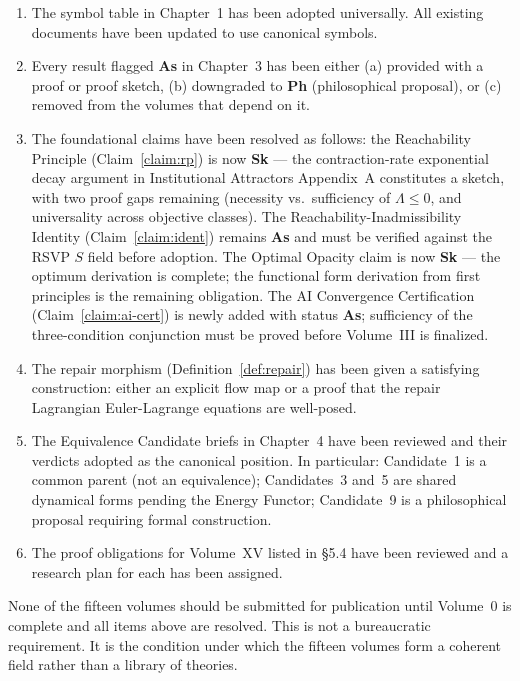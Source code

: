 \documentclass[11pt, a4paper]{book}
\theoremstyle{flyxion}
\theoremstyle{remark}
\begin{document}
\begin{enumerate}
\item The symbol table in Chapter~1 has been adopted universally.
  All existing documents have been updated to use canonical symbols.

\item Every result flagged \textbf{As} in Chapter~3 has been
  either (a) provided with a proof or proof sketch, (b) downgraded
  to \textbf{Ph} (philosophical proposal), or (c) removed from
  the volumes that depend on it.

\item The foundational claims have been resolved as follows:
  the Reachability Principle (Claim~\ref{claim:rp}) is now
  \textbf{Sk} --- the contraction-rate exponential decay argument
  in Institutional Attractors Appendix~A constitutes a sketch,
  with two proof gaps remaining (necessity vs.\ sufficiency of
  $\Lambda \leq 0$, and universality across objective classes).
  The Reachability-Inadmissibility Identity (Claim~\ref{claim:ident})
  remains \textbf{As} and must be verified against the RSVP $S$ field
  before adoption. The Optimal Opacity claim is now \textbf{Sk} ---
  the optimum derivation is complete; the functional form derivation
  from first principles is the remaining obligation. The AI
  Convergence Certification (Claim~\ref{claim:ai-cert}) is newly
  added with status \textbf{As}; sufficiency of the three-condition
  conjunction must be proved before Volume~III is finalized.

\item The repair morphism (Definition~\ref{def:repair}) has been
  given a satisfying construction: either an explicit flow map or
  a proof that the repair Lagrangian Euler-Lagrange equations are
  well-posed.

\item The Equivalence Candidate briefs in Chapter~4 have been
  reviewed and their verdicts adopted as the canonical position.
  In particular: Candidate~1 is a common parent (not an
  equivalence); Candidates~3 and~5 are shared dynamical forms
  pending the Energy Functor; Candidate~9 is a philosophical
  proposal requiring formal construction.

\item The proof obligations for Volume~XV listed in §5.4 have
  been reviewed and a research plan for each has been assigned.
\end{enumerate}

\begin{warningbox}
None of the fifteen volumes should be submitted for publication
until Volume~0 is complete and all items above are resolved.
This is not a bureaucratic requirement. It is the condition under
which the fifteen volumes form a coherent field rather than a
library of theories.
\end{warningbox}

\end{document}
